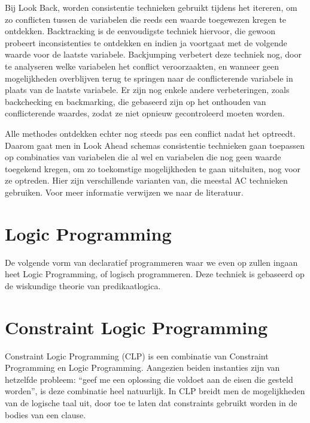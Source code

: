 Bij Look Back, worden consistentie technieken gebruikt tijdens het itereren, om zo conflicten tussen de variabelen die reeds een waarde toegewezen kregen te ontdekken. Backtracking is de eenvoudigste techniek hiervoor, die gewoon probeert inconsistenties te ontdekken en indien ja voortgaat met de volgende waarde voor de laatste variabele. Backjumping verbetert deze techniek nog, door te analyseren welke variabelen het conflict veroorzaakten, en wanneer geen mogelijkheden overblijven terug te springen naar de conflicterende variabele in plaats van de laatste variabele. Er zijn nog enkele andere verbeteringen, zoals backchecking en backmarking, die gebaseerd zijn op het onthouden van conflicterende waardes, zodat ze niet opnieuw gecontroleerd moeten worden.

Alle methodes ontdekken echter nog steeds pas een conflict nadat het optreedt. Daarom gaat men in Look Ahead schemas consistentie technieken gaan toepassen op combinaties van variabelen die al wel en variabelen die nog geen waarde toegekend kregen, om zo toekomstige mogelijkheden te gaan uitsluiten, nog voor ze optreden. Hier zijn verschillende varianten van, die meestal AC technieken gebruiken. Voor meer informatie verwijzen we naar de literatuur.

\section{Logic Programming}

De volgende vorm van declaratief programmeren waar we even op zullen ingaan heet Logic Programming, of logisch programmeren. Deze techniek is gebaseerd op de wiskundige theorie van predikaatlogica.


\section{Constraint Logic Programming}

Constraint Logic Programming (CLP) is een combinatie van Constraint Programming en Logic Programming. Aangezien beiden instanties zijn van hetzelfde probleem: ``geef me een oplossing die voldoet aan de eisen die gesteld worden'', is deze combinatie heel natuurlijk. In CLP breidt men de mogelijkheden van de logische taal uit, door toe te laten dat constraints gebruikt worden in de bodies van een clause. 

